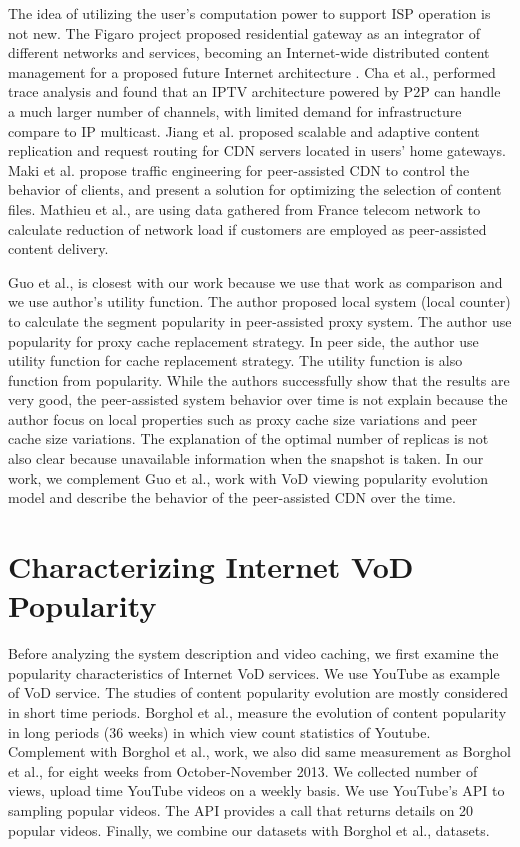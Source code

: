 \documentclass[10pt,final,journal,a4paper]{IEEEtran}
\begin{document}
The idea of utilizing the user's computation power to support ISP operation is not new.  
The Figaro project \cite{figaro} proposed residential gateway as an integrator of different networks and services, becoming an Internet-wide distributed content management for a proposed future Internet architecture \cite{figaro}.  
Cha et al.,\cite{Cha:2008:NTP:1855641.1855646} performed trace analysis and found that an IPTV architecture powered by P2P can handle a much larger number of channels, with limited demand for infrastructure compare to IP multicast.  
Jiang et al. \cite{Jiang:2012:OMD:2413176.2413193} proposed scalable and adaptive content replication and request routing for CDN servers located in users' home gateways.  
Maki et al.\cite{NaoyaMAKI2012} propose traffic engineering for peer-assisted CDN to control the behavior of clients, and present a solution for optimizing the selection of content files.
Mathieu et al., \cite{6249305} are using data gathered from France telecom network to calculate reduction of network load if customers are employed as peer-assisted content delivery.

Guo et al., \cite{1613869} is closest with our work because we use that work as comparison and we use author's utility function.
The author proposed local system (local counter) to calculate the segment popularity in peer-assisted proxy system. 
The author use popularity for proxy cache replacement strategy. 
In peer side, the author use utility function for cache replacement strategy.  
The utility function is also function from popularity.
While the authors successfully show that the results are very good, the peer-assisted system behavior over time is not explain because the author focus on local properties such as proxy cache size variations and peer cache size variations.
The explanation of the optimal number of replicas is not also clear because unavailable information when the snapshot is taken.  
In our work, we complement Guo et al., \cite{1613869} work with VoD viewing popularity evolution model and describe the behavior of the peer-assisted CDN over the time.


\section{Characterizing Internet VoD Popularity}\label{popularity}
Before analyzing the system description and video caching, we first examine the popularity characteristics of Internet VoD services.
We use YouTube as example of VoD service.
The studies of content popularity evolution are mostly considered in short time periods.
Borghol et al., \cite{Borghol:2011:CMP:2039452.2039717} measure the evolution of content popularity in long periods (36 weeks) in which view count statistics of Youtube. 
Complement with Borghol et al., \cite{Borghol:2011:CMP:2039452.2039717} work, we also did same measurement as Borghol et al., \cite{Borghol:2011:CMP:2039452.2039717} for eight weeks from October-November 2013.
We collected number of views, upload time YouTube videos on a weekly basis.
We use YouTube's API to sampling popular videos. 
The API provides a call that returns details on 20 popular videos.
Finally, we combine our datasets with Borghol et al.,\cite{Borghol:2011:CMP:2039452.2039717} datasets. 
\end{document}
